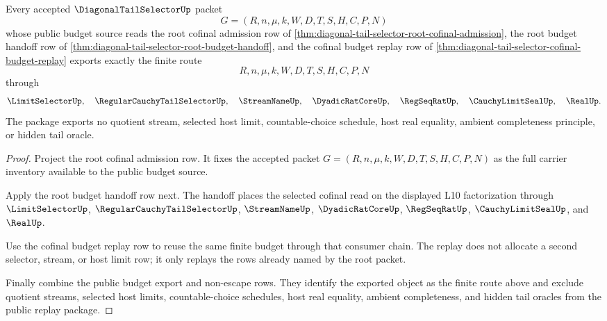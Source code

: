 \begin{theorem}
\label{thm:diagonal-tail-selector-public-root-replay-package}
Every accepted $\DiagonalTailSelectorUp$ packet
$$
G=(R,n,\mu,k,W,D,T,S,H,C,P,N)
$$
whose public budget source reads the root cofinal admission row of
\autoref{thm:diagonal-tail-selector-root-cofinal-admission}, the root budget
handoff row of \autoref{thm:diagonal-tail-selector-root-budget-handoff}, and
the cofinal budget replay row of
\autoref{thm:diagonal-tail-selector-cofinal-budget-replay} exports exactly the
finite route
$$
R,n,\mu,k,W,D,T,S,H,C,P,N
$$
through
$$
\LimitSelectorUp,\quad
\RegularCauchyTailSelectorUp,\quad
\StreamNameUp,\quad
\DyadicRatCoreUp,\quad
\RegSeqRatUp,\quad
\CauchyLimitSealUp,\quad
\RealUp.
$$
The package exports no quotient stream, selected host limit, countable-choice
schedule, host real equality, ambient completeness principle, or hidden tail
oracle.
\end{theorem}
\begin{proof}
Project the root cofinal admission row. It fixes the accepted packet
$G=(R,n,\mu,k,W,D,T,S,H,C,P,N)$ as the full carrier inventory available to the
public budget source.

Apply the root budget handoff row next. The handoff places the selected cofinal
read on the displayed L10 factorization through $\LimitSelectorUp$,
$\RegularCauchyTailSelectorUp$, $\StreamNameUp$, $\DyadicRatCoreUp$,
$\RegSeqRatUp$, $\CauchyLimitSealUp$, and $\RealUp$.

Use the cofinal budget replay row to reuse the same finite budget through that
consumer chain. The replay does not allocate a second selector, stream, or host
limit row; it only replays the rows already named by the root packet.

Finally combine the public budget export and non-escape rows. They identify
the exported object as the finite route above and exclude quotient streams,
selected host limits, countable-choice schedules, host real equality, ambient
completeness, and hidden tail oracles from the public replay package.
\end{proof}

